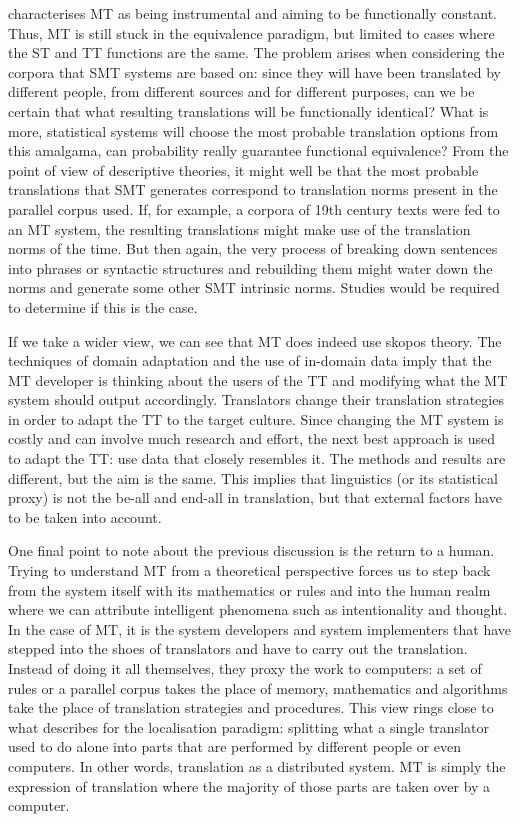 \noindent \textcite{culo2014approaching} characterises \ac{MT} as being instrumental and aiming to be functionally constant. Thus, \ac{MT} is still stuck in the equivalence paradigm, but limited to cases where the \ac{ST} and \ac{TT} functions are the same. The problem arises when considering the corpora that \ac{SMT} systems are based on: since they will have been translated by different people, from different sources and for different purposes, can we be certain that what resulting translations will be functionally identical? What is more, statistical systems will choose the most probable translation options from this amalgama, can probability really guarantee functional equivalence? From the point of view of descriptive theories, it might well be that the most probable translations that \ac{SMT} generates correspond to translation norms present in the parallel corpus used. If, for example, a corpora of 19th century texts were fed to an \ac{MT} system, the resulting translations might make use of the translation norms of the time. But then again, the very process of breaking down sentences into phrases or syntactic structures and rebuilding them might water down the norms and generate some other \ac{SMT} intrinsic norms. Studies would be required to determine if this is the case.

If we take a wider view, we can see that \ac{MT} does indeed use skopos theory. The techniques of domain adaptation and the use of in-domain data imply that the \ac{MT} developer is thinking about the users of the \ac{TT} and modifying what the \ac{MT} system should output accordingly. Translators change their translation strategies in order to adapt the \ac{TT} to the target culture. Since changing the \ac{MT} system is costly and can involve much research and effort, the next best approach is used to adapt the \ac{TT}: use data that closely resembles it. The methods and results are different, but the aim is the same. This implies that linguistics (or its statistical proxy) is not the be-all and end-all in translation, but that external factors have to be taken into account. 

One final point to note about the previous discussion is the return to a human. Trying to understand \ac{MT} from a theoretical perspective forces us to step back from the system itself with its mathematics or rules and into the human realm where we can attribute intelligent phenomena such as intentionality and thought. In the case of \ac{MT}, it is the system developers and system implementers that have stepped into the shoes of translators and have to carry out the translation. Instead of doing it all themselves, they proxy the work to computers: a set of rules or a parallel corpus takes the place of memory, mathematics and algorithms take the place of translation strategies and procedures. This view rings close to what \textcite{pym2009exploring} describes for the localisation paradigm: splitting what a single translator used to do alone into parts that are performed by different people or even computers. In other words, translation as a distributed system. \ac{MT} is simply the expression of translation where the majority of those parts are taken over by a computer.

